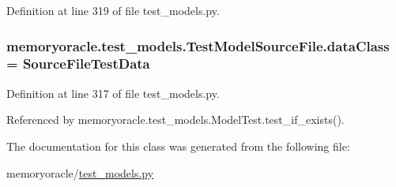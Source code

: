 Definition at line 319 of file test\+\_\+models.\+py.

\hypertarget{classmemoryoracle_1_1test__models_1_1TestModelSourceFile_aa271a58c7db3b5c7057a6b0c9eecc17c}{}
\subsubsection[{data\+Class}]{\setlength{\rightskip}{0pt plus 5cm}memoryoracle.\+test\+\_\+models.\+Test\+Model\+Source\+File.\+data\+Class = {\bf Source\+File\+Test\+Data}\hspace{0.3cm}{\ttfamily [static]}}\label{classmemoryoracle_1_1test__models_1_1TestModelSourceFile_aa271a58c7db3b5c7057a6b0c9eecc17c}


Definition at line 317 of file test\+\_\+models.\+py.



Referenced by memoryoracle.\+test\+\_\+models.\+Model\+Test.\+test\+\_\+if\+\_\+exists().



The documentation for this class was generated from the following file\+:\begin{DoxyCompactItemize}
\item 
memoryoracle/\hyperlink{test__models_8py}{test\+\_\+models.\+py}\end{DoxyCompactItemize}
